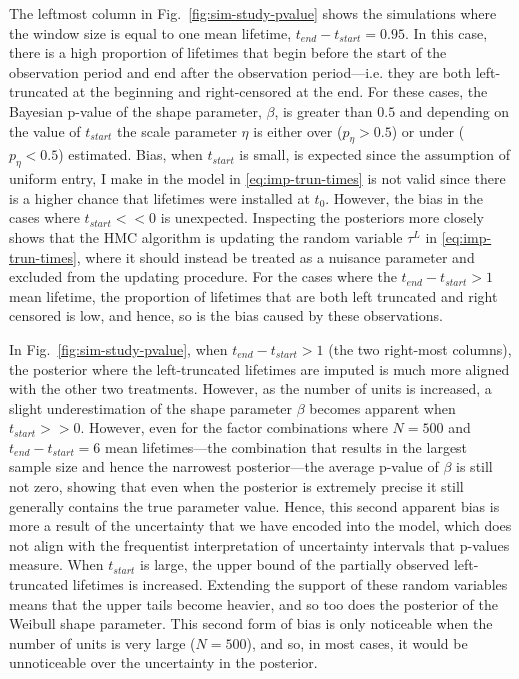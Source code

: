 The leftmost column in Fig.~\ref{fig:sim-study-pvalue} shows the simulations where the window size is equal to one mean lifetime, $t_{end} - t_{start} = 0.95$. In this case, there is a high proportion of lifetimes that begin before the start of the observation period and end after the observation period---i.e. they are both left-truncated at the beginning and right-censored at the end. For these cases, the Bayesian p-value of the shape parameter, $\beta$, is greater than $0.5$ and depending on the value of $t_{start}$ the scale parameter $\eta$ is either over ($p_{\eta} > 0.5$) or under ($p_{\eta} < 0.5$) estimated. Bias, when $t_{start}$ is small, is expected since the assumption of uniform entry, I make in the model in \eqref{eq:imp-trun-times} is not valid since there is a higher chance that lifetimes were installed at $t_0$. However, the bias in the cases where $t_{start} << 0$ is unexpected. Inspecting the posteriors more closely shows that the HMC algorithm is updating the random variable $\tau^L$ in \eqref{eq:imp-trun-times}, where it should instead be treated as a nuisance parameter and excluded from the updating procedure. For the cases where the $t_{end} - t_{start} > 1$ mean lifetime, the proportion of lifetimes that are both left truncated and right censored is low, and hence, so is the bias caused by these observations. 

In Fig.~\ref{fig:sim-study-pvalue}, when $t_{end} - t_{start} > 1$ (the two right-most columns), the posterior where the left-truncated lifetimes are imputed is much more aligned with the other two treatments. However, as the number of units is increased, a slight underestimation of the shape parameter $\beta$ becomes apparent when $t_{start} >> 0$. However, even for the factor combinations where $N = 500$ and $t_{end} - t_{start} = 6$ mean lifetimes---the combination that results in the largest sample size and hence the narrowest posterior---the average p-value of $\beta$ is still not zero, showing that even when the posterior is extremely precise it still generally contains the true parameter value. Hence, this second apparent bias is more a result of the uncertainty that we have encoded into the model, which does not align with the frequentist interpretation of uncertainty intervals that p-values measure. When $t_{start}$ is large, the upper bound of the partially observed left-truncated lifetimes is increased. Extending the support of these random variables means that the upper tails become heavier, and so too does the posterior of the Weibull shape parameter. This second form of bias is only noticeable when the number of units is very large ($N = 500$), and so, in most cases, it would be unnoticeable over the uncertainty in the posterior.

